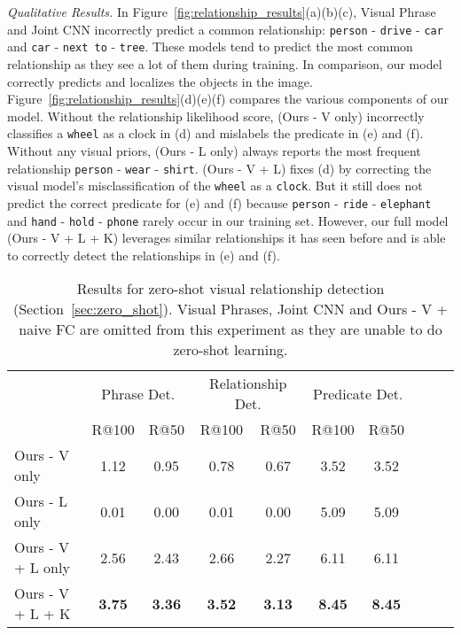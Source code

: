 \documentclass[runningheads]{llncs}
\newcommand{\relationship}[3]{\texttt{#1} - \texttt{#2} - \texttt{#3}}
\begin{document}
\textit{Qualitative Results.} In Figure~\ref{fig:relationship_results}(a)(b)(c), Visual Phrase and Joint CNN incorrectly predict a common relationship: \relationship{person}{drive}{car} and \relationship{car}{next to}{tree}. These models tend to predict the most common relationship as they see a lot of them during training. In comparison, our model correctly predicts and localizes the objects in the image. Figure~\ref{fig:relationship_results}(d)(e)(f) compares the various components of our model. Without the relationship likelihood score, (Ours - V only) incorrectly classifies a \texttt{wheel} as a clock in (d) and mislabels the predicate in (e) and (f). Without any visual priors, (Ours - L only) always reports the most frequent relationship \relationship{person}{wear}{shirt}. (Ours - V + L) fixes (d) by correcting the visual model's misclassification of the \texttt{wheel} as a \texttt{clock}. But it still does not predict the correct predicate for (e) and (f) because \relationship{person}{ride}{elephant} and \relationship{hand}{hold}{phone} rarely occur in our training set. However, our full model (Ours - V + L + K) leverages similar relationships it has seen before and is able to correctly detect the relationships in (e) and (f).

\begin{table}[t]
\centering
\small
\setlength{\tabcolsep}{2pt}
\caption{Results for zero-shot visual relationship detection (Section~\ref{sec:zero_shot}). Visual Phrases, Joint CNN and Ours - V + naive FC are omitted from this experiment as they are unable to do zero-shot learning.}
\begin{tabular}{l  c  c  c  c  c  c c c c }
         & \multicolumn{2}{c}{Phrase Det.}  &\multicolumn{2}{c}{Relationship Det.} & \multicolumn{2}{c}{Predicate Det.}   \\
         & R@100 &   \multicolumn{1}{c}{R@50} & R@100   &\multicolumn{1}{c}{R@50} & R@100   & \multicolumn{1}{c}{R@50}  \\
        \hline
        \hline
        Ours - V only      & 1.12          & 0.95          &   0.78        & 0.67          & 3.52          &  3.52 \\
        Ours - L only      & 0.01          & 0.00          &   0.01        & 0.00          & 5.09          &  5.09  \\
        Ours - V + L only  & 2.56          & 2.43          &  2.66         & 2.27          & 6.11          &  6.11  \\
        Ours - V + L + K   &\textbf{3.75}  &\textbf{3.36}  &\textbf{3.52}  &\textbf{3.13}  &\textbf{8.45}  &\textbf{8.45}  \\
        \hline
\end{tabular}
\label{tab:relationship_results_zero_shot}
\end{table}
\end{document}
